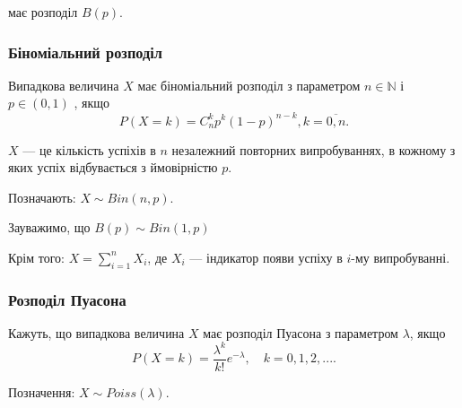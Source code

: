 має розподіл $B(p)$.

\subsubsection{Біноміальний розподіл}

Випадкова величина $X$ має біноміальний розподіл з параметром
$n \in \mathbb{N}$ і $p \in (0, 1)$ , якщо 
$$P(X=k) = C_n^k p^k(1-p)^{n-k}, k = \overline{0, n}.$$

$X$ --- це кількість успіхів в $n$ незалежний повторних випробуваннях,
в кожному з яких успіх відбувається з ймовірністю $p$.

Позначають: $X \sim Bin(n, p)$.

Зауважимо, що $B(p) \sim Bin(1, p)$

Крім того: $X = \sum\limits_{i=1}^n X_i$, де $X_i$ --- індикатор появи
успіху в $i$-му випробуванні.

\subsubsection{Розподіл Пуасона}

Кажуть, що випадкова величина $X$ має розподіл Пуасона з параметром
$\lambda$, якщо 
$$P(X=k)
= \frac{\lambda^k}{k!} e^{-\lambda}, \quad k = 0, 1, 2, ....$$

Позначення: $X \sim Poiss(\lambda)$.

